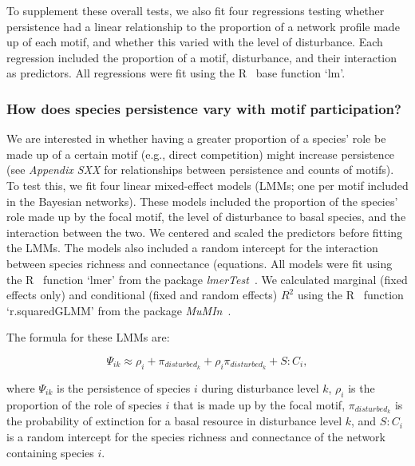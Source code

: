 \documentclass[12pt]{article}
\begin{document}
\begin{spacing}{2.0}
            
            To supplement these overall tests, we also fit four regressions testing whether persistence had a linear relationship to the proportion of a network profile made up of each motif, and whether this varied with the level of disturbance.
            Each regression included the proportion of a motif, disturbance, and their interaction as predictors.
            All regressions were fit using the R~\citep{R} base function `lm'.
        
        
        \subsubsection*{How does species persistence vary with motif participation?}

            We are interested in whether having a greater proportion of a species' role be made up of a certain motif (e.g., direct competition) might increase persistence (see \emph{Appendix SXX} for relationships between persistence and counts of motifs).
            To test this, we fit four linear mixed-effect models (LMMs; one per motif included in the Bayesian networks).
            These models included the proportion of the species' role made up by the focal motif, the level of disturbance to basal species, and the interaction between the two.
            We centered and scaled the predictors before fitting the LMMs.
            The models also included a random intercept for the interaction between species richness and connectance (equations.
            All models were fit using the R~\citep{R} function `lmer' from the package \emph{lmerTest}~\citep{lmerTest}.
            We calculated marginal (fixed effects only) and conditional (fixed and random effects) $R^2$ using the R~\citep{R} function `r.squaredGLMM' from the package \emph{MuMIn}~\citep{MuMIn}.

            The formula for these LMMs are:       
            
            \begin{equation}
                \Psi_{ik} \approx \rho_{i} + \pi_{disturbed_k} + \rho_{i}\pi_{disturbed_k} +
                S:C_{i} ,
                \label{propreq}
            \end{equation}


            where $\Psi_{ik}$ is the persistence of species $i$ during disturbance level $k$, $\rho_{i}$ is the proportion of the role of species $i$ that is made up by the focal motif, $\pi_{disturbed_k}$ is the probability of extinction for a basal resource in disturbance level $k$, and $S:C_{i}$ is a random intercept for the species richness and connectance of the network containing species $i$.
    

\end{spacing}
\end{document}

